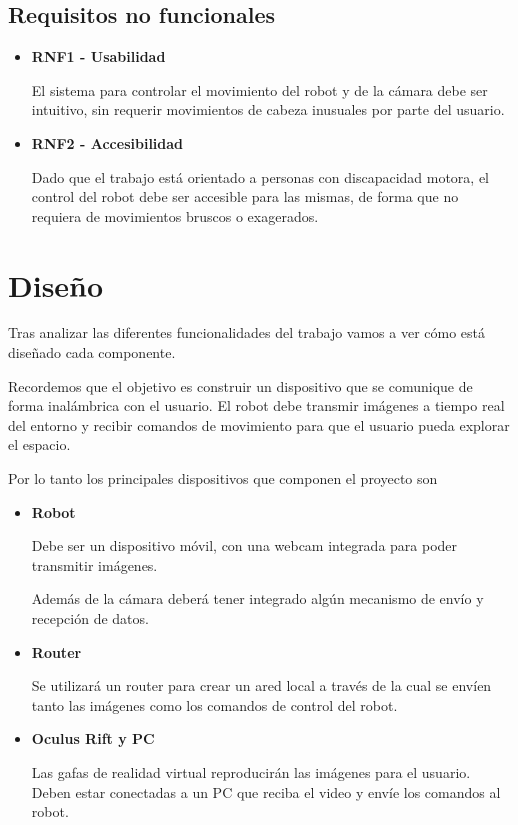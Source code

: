 \documentclass[twoside, 11pt]{epstfg}
\begin{document}
\section{Requisitos no funcionales}

\begin{itemize}
	\item \textbf{RNF1 - Usabilidad}
	
	
	El sistema para controlar el movimiento del robot y de la cámara debe ser intuitivo, sin requerir movimientos de cabeza inusuales por parte del usuario.
	
	
	
	\item \textbf{RNF2 - Accesibilidad}
	
	Dado que el trabajo está orientado a personas con discapacidad motora, el control del robot debe ser accesible para las mismas, de forma que no requiera de movimientos bruscos o exagerados. 
\end{itemize}

\newpage
\chapter{Diseño}

Tras analizar las diferentes funcionalidades del trabajo vamos a ver cómo está diseñado cada componente.

Recordemos que el objetivo es construir un dispositivo que se comunique de forma inalámbrica con el usuario. El robot debe transmir imágenes a tiempo real del entorno y recibir comandos de movimiento para que el usuario pueda explorar el espacio.

Por lo tanto los principales dispositivos que componen el proyecto son 
\begin{itemize}
	\item \textbf{Robot} 
	
		Debe ser un dispositivo móvil, con una webcam integrada para poder transmitir imágenes.
		
		Además de la cámara deberá tener integrado algún mecanismo de envío y recepción de datos.
	\item \textbf{Router}
	
		Se utilizará un router para crear un ared local a través de la cual se envíen tanto las imágenes como los comandos de control del robot.
	\item \textbf{Oculus Rift y PC}
		
		Las gafas de realidad virtual reproducirán las imágenes para el usuario. Deben estar conectadas a un PC que reciba el video y envíe los comandos al robot.
		
\end{itemize}
\end{document}
